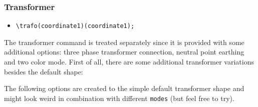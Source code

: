 \documentclass[a4]{article}
\begin{document}
\subsubsection{Transformer} 
\label{sec:Trafo}
\begin{itemize}
\item[]\color{myblue}\verb+\trafo(coordinate1)(coordinate1);+
\end{itemize}
The transformer command is treated separately since it is provided with some additional options: three phase transformer connection, neutral point earthing and two color mode. 
First of all, there are some additional transformer variations besides the default shape:
 
\begin{examplebox}
\end{examplebox}
The following options are created to the simple default transformer shape and might look weird in combination with different \verb+modes+ (but feel free to try).
\end{document}
